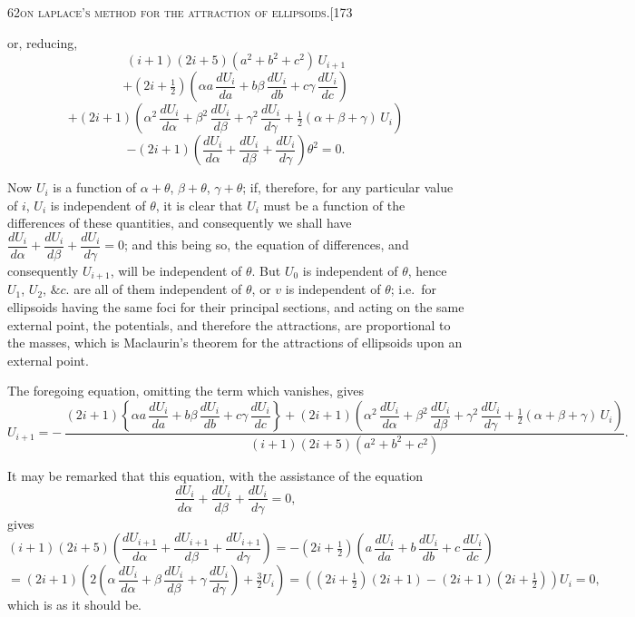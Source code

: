 \documentclass[11pt]{article}
\begin{document}
\newpage

\begin{center}
\small\textsc{62}\hfill\textsc{on laplace's method for the attraction of ellipsoids.}\hfill[173
\end{center}

\medskip

\noindent or, reducing,
\[
(i + 1)(2i + 5)(a^{2} + b^{2} + c^{2})\,U_{i+1}
\]
\[
+ (2i + \tfrac{1}{2})\left(\alpha a\,\frac{dU_{i}}{da} + b\beta\,\frac{dU_{i}}{db} + c\gamma\,\frac{dU_{i}}{dc}\right)
\]
\[
+ (2i + 1)\left(\alpha^{2}\,\frac{dU_{i}}{d\alpha} + \beta^{2}\,\frac{dU_{i}}{d\beta} + \gamma^{2}\,\frac{dU_{i}}{d\gamma} + \tfrac{1}{2}(\alpha + \beta + \gamma)\,U_{i}\right)
\]
\[
- (2i + 1)\left(\frac{dU_{i}}{d\alpha} + \frac{dU_{i}}{d\beta} + \frac{dU_{i}}{d\gamma}\right)\theta^{2} = 0.
\]

Now $U_{i}$ is a function of $\alpha + \theta$, $\beta + \theta$, $\gamma + \theta$; if, therefore, for any particular value
of $i$, $U_{i}$ is independent of $\theta$, it is clear that $U_{i}$ must be a function of the differences
of these quantities, and consequently we shall have $\dfrac{dU_{i}}{d\alpha} + \dfrac{dU_{i}}{d\beta} + \dfrac{dU_{i}}{d\gamma} = 0$; and this being so, the
equation of differences, and consequently $U_{i+1}$, will be independent of $\theta$. But $U_{0}$ is
independent of $\theta$, hence $U_{1}$, $U_{2}$, $\&c.$ are all of them independent of $\theta$, or $v$ is in\-dependent of $\theta$; i.e.\ for ellipsoids having the same foci for their principal sections, and
acting on the same external point, the potentials, and therefore the attractions, are
proportional to the masses, which is Maclaurin's theorem for the attractions of ellipsoids
upon an external point.

The foregoing equation, omitting the term which vanishes, gives
\[
U_{i+1} = -\,\frac{(2i + 1)\left\{\alpha a\,\dfrac{dU_{i}}{da} + b\beta\,\dfrac{dU_{i}}{db} + c\gamma\,\dfrac{dU_{i}}{dc}\right\} + (2i + 1)\left(\alpha^{2}\,\dfrac{dU_{i}}{d\alpha} + \beta^{2}\,\dfrac{dU_{i}}{d\beta} + \gamma^{2}\,\dfrac{dU_{i}}{d\gamma} + \tfrac{1}{2}(\alpha + \beta + \gamma)\,U_{i}\right)}{(i + 1)(2i + 5)(a^{2} + b^{2} + c^{2})}.
\]

It may be remarked that this equation, with the assistance of the equation
\[
\frac{dU_{i}}{d\alpha} + \frac{dU_{i}}{d\beta} + \frac{dU_{i}}{d\gamma} = 0,
\]
gives
\[
(i + 1)(2i + 5)\left(\frac{dU_{i+1}}{d\alpha} + \frac{dU_{i+1}}{d\beta} + \frac{dU_{i+1}}{d\gamma}\right) = - (2i + \tfrac{1}{2})\left(a\,\frac{dU_{i}}{da} + b\,\frac{dU_{i}}{db} + c\,\frac{dU_{i}}{dc}\right)
\]
\[
= (2i + 1)\left(2\left(\alpha\,\frac{dU_{i}}{d\alpha} + \beta\,\frac{dU_{i}}{d\beta} + \gamma\,\frac{dU_{i}}{d\gamma}\right) + \tfrac{3}{2}U_{i}\right) = \left((2i + \tfrac{1}{2})(2i + 1) - (2i + 1)(2i + \tfrac{1}{2})\right)U_{i} = 0,
\]
which is as it should be.
\end{document}
